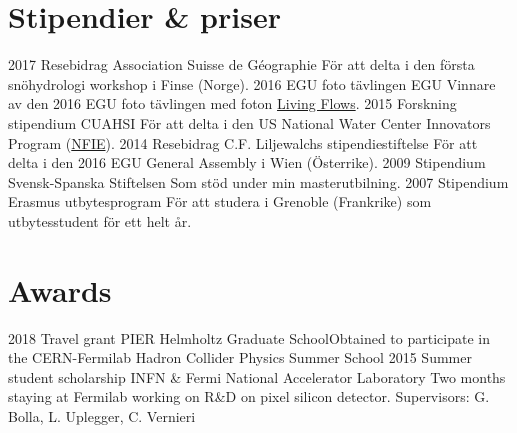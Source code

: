 \ifswedish
  \section{Stipendier \& priser}
    \position
      {2017}
      {Resebidrag}
      {Association Suisse de Géographie}
      {För att delta i den första snöhydrologi workshop i Finse (Norge).}
    \position
      {2016}
      {EGU foto tävlingen}
      {EGU}
      {Vinnare av den 2016 EGU foto tävlingen med foton \href{https://blogs.egu.eu/geolog/2016/08/29/imaggeo-on-mondays-living-flows/}{Living Flows}.}
    \position
      {2015}
      {Forskning stipendium}
      {CUAHSI}
      {För att delta i den US National Water Center Innovators Program  (\href{https://www.cuahsi.org/education/summerinstitute/}{NFIE}).}
    \position
      {2014}
      {Resebidrag}
      {C.F. Liljewalchs stipendiestiftelse}
      {För att delta i den 2016 EGU General Assembly i Wien (Österrike).}
    \position
      {2009}
      {Stipendium}
      {Svensk-Spanska Stiftelsen}
      {Som stöd under min masterutbilning.}
    \position
      {2007}
      {Stipendium}
      {Erasmus utbytesprogram}
      {För att studera i Grenoble (Frankrike) som utbytesstudent för ett helt år.}
\else
  \section{Awards}
    \ifacademic
      \position
        {2018}
        {Travel grant}
        {PIER Helmholtz Graduate School}{Obtained to participate in the CERN-Fermilab Hadron Collider Physics Summer School}      \position
        {2015}
        {Summer student scholarship}
        {INFN \& Fermi National Accelerator Laboratory} 
        {Two months staying at Fermilab working on R\&D on pixel silicon detector. \newline Supervisors: G. Bolla, L. Uplegger, C. Vernieri}
    \fi
\fi
